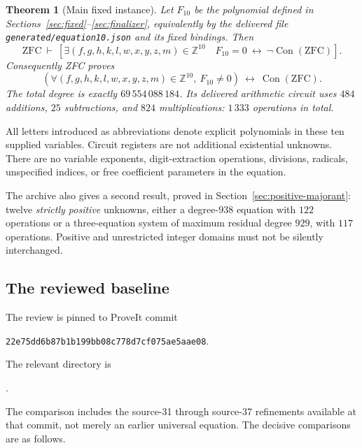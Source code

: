 \documentclass[11pt,letterpaper]{article}
\newcommand{\Z}{\mathbb Z}
\newcommand{\Con}{\operatorname{Con}}
\newcommand{\ZFC}{\mathrm{ZFC}}
\newtheorem{theorem}{Theorem}[section]
\theoremstyle{remark}
\begin{document}
\begin{theorem}[Main fixed instance]
\label{thm:main}
Let \(F_{10}\) be the polynomial defined in
Sections~\ref{sec:fixed}--\ref{sec:finalizer}, equivalently by the delivered
file \texttt{generated/equation10.json} and its fixed bindings. Then
\[
\ZFC\ \vdash\
\left[
 \exists(f,g,h,k,l,w,x,y,z,m)\in\Z^{10}\quad F_{10}=0
 \ \longleftrightarrow\ \neg\Con(\ZFC)
\right].
\]
Consequently ZFC proves
\[
\boxed{\quad
 \left(\forall(f,g,h,k,l,w,x,y,z,m)\in\Z^{10},\ F_{10}\ne0\right)
 \ \longleftrightarrow\ \Con(\ZFC).
\quad}
\]
The total degree is exactly \(69\,554\,088\,184\). Its delivered
arithmetic circuit uses \(484\) additions, \(25\) subtractions, and
\(824\) multiplications: \(1\,333\) operations in total.
\end{theorem}

All letters introduced as abbreviations denote explicit polynomials in
these ten supplied variables. Circuit registers are not additional
existential unknowns. There are no variable exponents, digit-extraction
operations, divisions, radicals, unspecified indices, or free coefficient
parameters in the equation.

The archive also gives a second result, proved in
Section~\ref{sec:positive-majorant}: twelve \emph{strictly positive}
unknowns, either a degree-\(938\) equation with \(122\) operations or a
three-equation system of maximum residual degree \(929\), with \(117\)
operations. Positive and unrestricted integer domains must not be
silently interchanged.

\subsection{The reviewed baseline}

The review is pinned to ProveIt commit
\begin{center}
\texttt{22e75dd6b87b1b199bb08c778d7cf075ae5aae08}.
\end{center}
The relevant directory is
\begin{center}\small
{}.
\end{center}
The comparison includes the source-31 through source-37 refinements
available at that commit, not merely an earlier universal equation.
The decisive comparisons are as follows.
\end{document}
